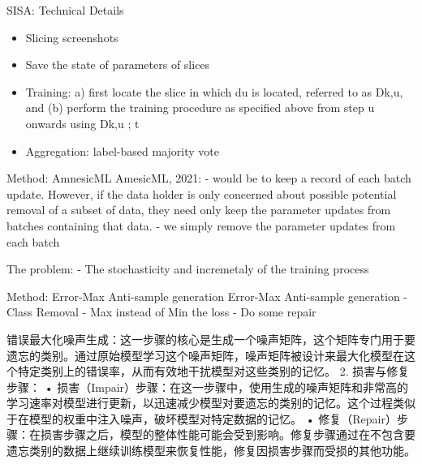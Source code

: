 \documentclass[
  ignorenonframetext,
  aspectratio=169,
]{beamer}
\providecommand{\tightlist}{%
  \setlength{\itemsep}{0pt}\setlength{\parskip}{0pt}}\usepackage{longtable,booktabs,array}
\begin{document}
\begin{frame}{SISA: Technical Details}
\label{sisa-technical-details}
\begin{itemize}
\tightlist
\item
  Slicing screenshots
\item
  Save the state of parameters of slices
\item
  Training: a) first locate the slice in which du is located, referred
  to as Dk,u, and (b) perform the training procedure as specified above
  from step u onwards using Dk,u \du; t
\item
  Aggregation: label-based majority vote
\end{itemize}
\end{frame}

\begin{frame}{Method: AmnesicML}
\label{method-amnesicml}
AmesicML, 2021: - would be to keep a record of each batch update.
However, if the data holder is only concerned about possible potential
removal of a subset of data, they need only keep the parameter updates
from batches containing that data. - we simply remove the parameter
updates from each batch

The problem: - The stochasticity and incremetaly of the training process
\end{frame}

\begin{frame}{Method: Error-Max Anti-sample generation}
\label{method-error-max-anti-sample-generation}
Error-Max Anti-sample generation - Class Removal - Max instead of Min
the loss - Do some repair

错误最大化噪声生成：这一步骤的核心是生成一个噪声矩阵，这个矩阵专门用于要遗忘的类别。通过原始模型学习这个噪声矩阵，噪声矩阵被设计来最大化模型在这个特定类别上的错误率，从而有效地干扰模型对这些类别的记忆。
2. 损害与修复步骤： •
损害（Impair）步骤：在这一步骤中，使用生成的噪声矩阵和非常高的学习速率对模型进行更新，以迅速减少模型对要遗忘的类别的记忆。这个过程类似于在模型的权重中注入噪声，破坏模型对特定数据的记忆。
•
修复（Repair）步骤：在损害步骤之后，模型的整体性能可能会受到影响。修复步骤通过在不包含要遗忘类别的数据上继续训练模型来恢复性能，修复因损害步骤而受损的其他功能。
\end{frame}
\end{document}
